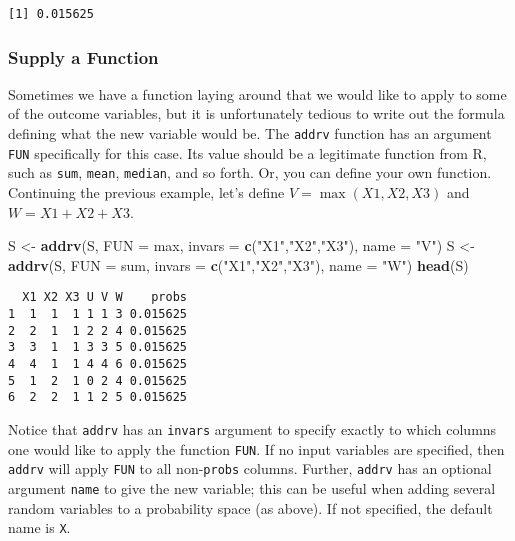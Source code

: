 \documentclass[]{book}
\newenvironment{Shaded}{\begin{snugshade}}{\end{snugshade}}
\newcommand{\KeywordTok}[1]{\textcolor[rgb]{0.13,0.29,0.53}{\textbf{{#1}}}}
\newcommand{\DataTypeTok}[1]{\textcolor[rgb]{0.13,0.29,0.53}{{#1}}}
\newcommand{\StringTok}[1]{\textcolor[rgb]{0.31,0.60,0.02}{{#1}}}
\newcommand{\NormalTok}[1]{{#1}}
\numberwithin{equation}{chapter}
\numberwithin{figure}{chapter}
\theoremstyle{plain}
\theoremstyle{definition}
\theoremstyle{remark}
\theoremstyle{definition}
\theoremstyle{definition}
\theoremstyle{remark}
\begin{document}
\begin{verbatim}
[1] 0.015625
\end{verbatim}

\subsubsection{Supply a Function}\label{supply-a-function}

Sometimes we have a function laying around that we would like to apply
to some of the outcome variables, but it is unfortunately tedious to
write out the formula defining what the new variable would be. The
\texttt{addrv} function has an argument \texttt{FUN} specifically for
this case. Its value should be a legitimate function from R, such as
\texttt{sum}, \texttt{mean}, \texttt{median}, and so forth. Or, you can
define your own function. Continuing the previous example, let's define
\(V=\max(X1,X2,X3)\) and \(W=X1+X2+X3\).

\begin{Shaded}
\begin{Highlighting}[]
\NormalTok{S <-}\StringTok{ }\KeywordTok{addrv}\NormalTok{(S, }\DataTypeTok{FUN =} \NormalTok{max, }\DataTypeTok{invars =} \KeywordTok{c}\NormalTok{(}\StringTok{"X1"}\NormalTok{,}\StringTok{"X2"}\NormalTok{,}\StringTok{"X3"}\NormalTok{), }\DataTypeTok{name =} \StringTok{"V"}\NormalTok{) }
\NormalTok{S <-}\StringTok{ }\KeywordTok{addrv}\NormalTok{(S, }\DataTypeTok{FUN =} \NormalTok{sum, }\DataTypeTok{invars =} \KeywordTok{c}\NormalTok{(}\StringTok{"X1"}\NormalTok{,}\StringTok{"X2"}\NormalTok{,}\StringTok{"X3"}\NormalTok{), }\DataTypeTok{name =} \StringTok{"W"}\NormalTok{) }
\KeywordTok{head}\NormalTok{(S) }
\end{Highlighting}
\end{Shaded}

\begin{verbatim}
  X1 X2 X3 U V W    probs
1  1  1  1 1 1 3 0.015625
2  2  1  1 2 2 4 0.015625
3  3  1  1 3 3 5 0.015625
4  4  1  1 4 4 6 0.015625
5  1  2  1 0 2 4 0.015625
6  2  2  1 1 2 5 0.015625
\end{verbatim}

Notice that \texttt{addrv} has an \texttt{invars} argument to specify
exactly to which columns one would like to apply the function
\texttt{FUN}. If no input variables are specified, then \texttt{addrv}
will apply \texttt{FUN} to all non-\texttt{probs} columns. Further,
\texttt{addrv} has an optional argument \texttt{name} to give the new
variable; this can be useful when adding several random variables to a
probability space (as above). If not specified, the default name is
\texttt{X}.
\end{document}
